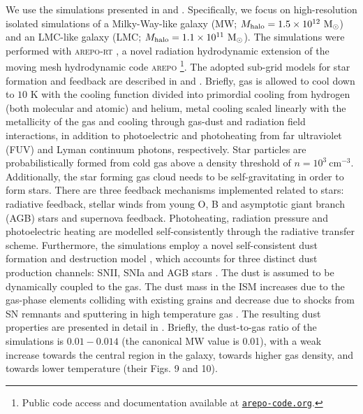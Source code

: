 \documentclass[fleqn,usenatbib]{mnras}
\begin{document}
We use the simulations presented in \citet{kannan20_mw} and \citet{kannan21_dust}. Specifically, we focus on high-resolution isolated simulations of a Milky-Way-like galaxy (MW; $M_{\rm halo}=1.5\times10^{12}~\text{M}_{\odot}$) and an LMC-like galaxy (LMC; $M_{\rm halo}=1.1\times10^{11}~\text{M}_{\odot}$). The simulations were performed with \mbox{\textsc{arepo-rt}} \citep{kannan19_rt}, a novel radiation hydrodynamic extension of the moving mesh hydrodynamic code \textsc{arepo} \citep{springel10, weinberger20}\footnote{Public code access and documentation available at \href{https://arepo-code.org}{\texttt{arepo-code.org}}.}. The adopted sub-grid models for star formation and feedback are described in \citet{marinacci19} and \citet{kannan20_mw}. Briefly, gas is allowed to cool down to $10$ K with the cooling function divided into primordial cooling from hydrogen (both molecular and atomic) and helium, metal cooling scaled linearly with the metallicity of the gas and cooling through gas-dust and radiation field interactions, in addition to photoelectric and photoheating from far ultraviolet (FUV) and Lyman continuum photons, respectively. Star particles are probabilistically formed from cold gas above a density threshold of $n=10^{3}~\mathrm{cm}^{-3}$. Additionally, the star forming gas cloud needs to be self-gravitating in order to form stars. There are three feedback mechanisms implemented related to stars: radiative feedback, stellar winds from young O, B and asymptotic giant branch (AGB) stars and supernova feedback. Photoheating, radiation pressure and photoelectric heating are modelled self-consistently through the radiative transfer scheme. Furthermore, the simulations employ a novel self-consistent dust formation and destruction model \citep{mckinnon16, mckinnon17}, which accounts for three distinct dust production channels: SNII, SNIa and AGB stars \citep{dwek98}. The dust is assumed to be dynamically coupled to the gas. The dust mass in the ISM increases due to the gas-phase elements colliding with existing grains \citep{dwek98} and decrease due to shocks from SN remnants \citep{mckee89} and sputtering in high temperature gas \citep{tsai95}. The resulting dust properties are presented in detail in \citet{kannan20_mw}. Briefly, the dust-to-gas ratio of the simulations is $0.01-0.014$ (the canonical MW value is 0.01), with a weak increase towards the central region in the galaxy, towards higher gas density, and towards lower temperature (their Figs. 9 and 10).
\end{document}
